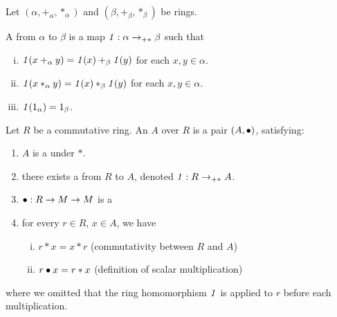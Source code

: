 
\begin{definition}
    \label{RingHom}
    \leanok

    Let $(\alpha, +_\alpha, *_\alpha)$ and $(\beta, +_\beta, *_\beta)$ be rings.
    
    A  from $\alpha$ to $\beta$ is a map $\mathit{1} : \alpha \to_{+*} \beta$ such that

    \begin{enumerate}[(i)]
        \item $\mathit{1}(x +_{\alpha} y) = \mathit{1}(x) +_{\beta} \mathit{1}(y)$ for each $x,y \in \alpha$.
        \item $\mathit{1}(x *_{\alpha} y) = \mathit{1}(x) *_{\beta} \mathit{1}(y)$ for each $x,y \in \alpha$.
        \item $\mathit{1}(1_{\alpha}) = 1_{\beta}$.
    \end{enumerate}

\end{definition}

\begin{definition}[Algebra]
    \label{Algebra}
    \leanok

    Let $R$ be a commutative ring. An  $A$ over $R$ is a pair $(A, \bullet)$, satisfying:

    \begin{enumerate}
    \item $A$ is a  under $*$.
    
    \item there exists a  from $R$ to $A$, denoted $\mathit{1} : R \to_{+*} A$.
    
    \item $\bullet : R \to M \to M$ is a 
    
    \item for every $r \in R$, $x \in A$, we have

    \begin{enumerate}[(i)]
        \item $r * x = x * r$ (commutativity between $R$ and $A$)
        \item $r \bullet x = r * x$ (definition of scalar multiplication)
    \end{enumerate}

    \end{enumerate}

    where we omitted that the ring homomorphism $\mathit{1}$ is applied to $r$ before each multiplication.

\end{definition}

